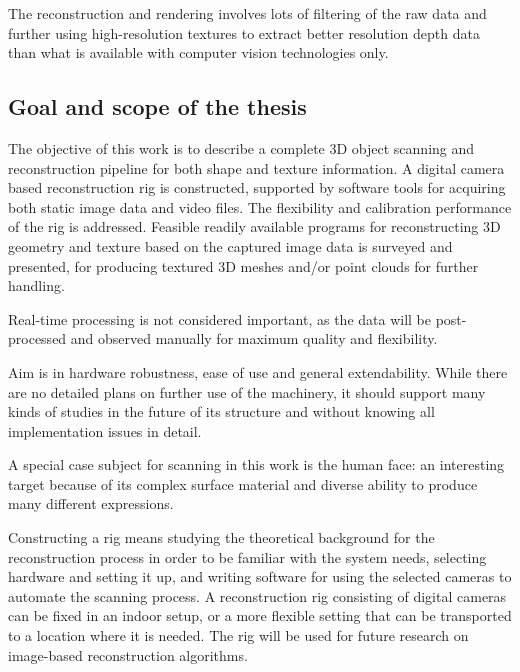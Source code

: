 
The reconstruction and rendering involves lots of filtering of the raw data and further using high-resolution textures to extract better resolution depth data than what is available with computer vision technologies only.



\subsection{Goal and scope of the thesis}



The objective of this work is to describe a complete 3D object scanning and reconstruction pipeline for both shape and texture information.
A digital camera based reconstruction rig is constructed, supported by software tools for acquiring both static image data and video files.
The flexibility and calibration performance of the rig is addressed.
Feasible readily available programs for reconstructing 3D geometry and texture based on the captured image data is surveyed and presented, for producing textured 3D meshes and/or point clouds for further handling.

Real-time processing is not considered important, as the data will be post-processed and observed manually for maximum quality and flexibility.

Aim is in hardware robustness, ease of use and general extendability. While there are no detailed plans on further use of the machinery, it should support many kinds of studies in the future of its structure and without knowing all implementation issues in detail.

A special case subject for scanning in this work is the human face: an interesting target because of its complex surface material and diverse ability to produce many different expressions.

Constructing a rig means studying the theoretical background for the reconstruction process in order to be familiar with the system needs, selecting hardware and setting it up, and writing software for using the selected cameras to automate the scanning process.
A reconstruction rig consisting of digital cameras can be fixed in an indoor setup, or a more flexible setting that can be transported to a location where it is needed.
The rig will be used for future research on image-based reconstruction algorithms.

